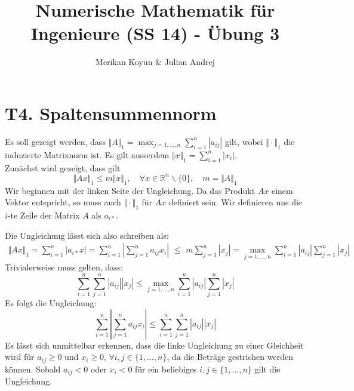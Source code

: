 \documentclass[11pt]{article}
\theoremstyle{plain}
\theoremstyle{definition}
\renewcommand{\a}{\"{a}}
\renewcommand{\o}{\"{o}}
\renewcommand{\u}{\"{u}}
\begin{document}
\title{Numerische Mathematik f\u r Ingenieure (SS 14) - \"{U}bung 3}
\author{Merikan Koyun \& Julian Andrej}
\maketitle

\section*{T4. Spaltensummennorm}
Es soll gezeigt werden, dass $\Vert A\Vert_1 = \max_{j=1,...,n} \sum_{i=1}^n |a_{ij}|$ gilt, wobei $\Vert\cdot\Vert_1$ die induzierte Matrixnorm ist. Es gilt ausserdem $\Vert x \Vert_1 = \sum_{i=1}^n |x_i|$. \\
Zun\a chst wird gezeigt, dass gilt
\begin{equation}
\Vert Ax\Vert_1 \leq m \Vert x\Vert_1, \quad \forall x \in \mathbb{R}^n \backslash \{0\}, \quad m=\Vert A \Vert_1
\label{beh}
\end{equation}
Wir beginnen mit der linken Seite der Ungleichung. Da das Produkt $Ax$ einem Vektor entspricht, so muss auch $\Vert\cdot \Vert_1$ f\u r $Ax$ definiert sein. Wir definieren uns die $i$-te Zeile der Matrix $A$ als $a_{i*}$.

Die Ungleichung l\a sst sich also schreiben als:
\begin{align*}
\Vert Ax \Vert_1 =  \sum_{i=1}^n |a_{i*}x| = \sum_{i=1}^n \left| \sum_{j=1}^n a_{ij}x_i \right| 
 \,\,\leq\,\, m \sum_{j=1}^n |x_j| = \max_{j=1,...,n} \sum_{i=1}^n |a_{ij}| \sum_{j=1}^n |x_j| \end{align*}
Trivialerweise muss gelten, dass:
\begin{equation}
 \sum_{i=1}^n \sum_{j=1}^n |a_{ij}||x_j| \leq \max_{j=1,...,n} \sum_{i=1}^n |a_{ij}| \sum_{j=1}^n |x_j|
\end{equation}
Es folgt die Ungleichung:
\begin{equation}
\sum_{i=1}^n \left| \sum_{j=1}^n a_{ij}x_i \right|  \leq  \sum_{i=1}^n \sum_{j=1}^n |a_{ij}||x_j|
\end{equation}
Es l\a sst sich unmittelbar erkennen, dass die linke Ungleichung zu einer Gleichheit wird f\u r $a_{ij} \geq 0$ und $x_i \geq 0,\, \forall i,j \in \{1,...,n\}$, da die Betr\a ge gestrichen werden k\o nnen. Sobald $a_{ij} < 0$ oder $x_i < 0$ f\u r ein beliebiges $i,j \in \{1,...,n\}$ gilt die Ungleichung.\\
\end{document}
